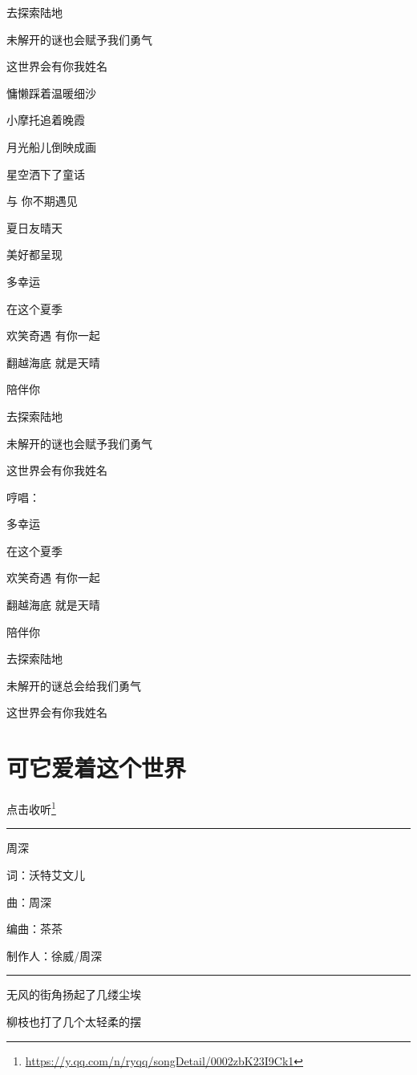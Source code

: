 \documentclass[]{ctexbook}
\renewcommand{\href}[2]{#2\footnote{\url{#1}}}
\begin{document}
去探索陆地

未解开的谜也会赋予我们勇气

这世界会有你我姓名

慵懒踩着温暖细沙

小摩托追着晚霞

月光船儿倒映成画

星空洒下了童话

与 你不期遇见

夏日友晴天

美好都呈现

多幸运

在这个夏季

欢笑奇遇 有你一起

翻越海底 就是天晴

陪伴你

去探索陆地

未解开的谜也会赋予我们勇气

这世界会有你我姓名

哼唱：

多幸运

在这个夏季

欢笑奇遇 有你一起

翻越海底 就是天晴

陪伴你

去探索陆地

未解开的谜总会给我们勇气

这世界会有你我姓名

\section*{可它爱着这个世界}\label{love-the-world}


\href{https://y.qq.com/n/ryqq/songDetail/0002zbK23I9Ck1}{点击收听}

\begin{center}\rule{0.5\linewidth}{0.5pt}\end{center}

周深

词：沃特艾文儿

曲：周深

编曲：茶茶

制作人：徐威/周深

\begin{center}\rule{0.5\linewidth}{0.5pt}\end{center}

无风的街角扬起了几缕尘埃

柳枝也打了几个太轻柔的摆
\end{document}
